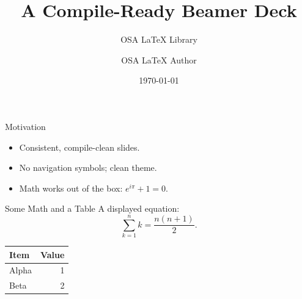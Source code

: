 \documentclass{beamer}
\title{A Compile-Ready Beamer Deck}
\subtitle{OSA \LaTeX{} Library}
\author{OSA \LaTeX{} Author}
\date{\today}
\begin{document}
\begin{frame}
  \titlepage
\end{frame}

\begin{frame}{Motivation}
  \begin{itemize}
    \item Consistent, compile-clean slides.
    \item No navigation symbols; clean theme.
    \item Math works out of the box: $e^{i\pi} + 1 = 0$.
  \end{itemize}
\end{frame}

\begin{frame}{Some Math and a Table}
  A displayed equation:
  \[
    \sum_{k=1}^{n} k = \frac{n(n+1)}{2}.
  \]
  \begin{table}
    \centering
    \begin{tabular}{lr}
      \toprule
      Item & Value \\
      \midrule
      Alpha & 1 \\
      Beta  & 2 \\
      \bottomrule
    \end{tabular}
  \end{table}
\end{frame}
\end{document}
